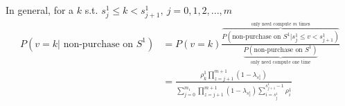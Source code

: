 In general, for a $k$ s.t. $s_{j}^1\leq k< s_{j+1}^1,\ j=0,1,2,...,m$
\begin{equation}
    \begin{aligned}
        P(v=k \vert\text{ non-purchase on }S^1)
        &=P(v=k)\frac{\overbrace{P(\text{non-purchase on }S^1\vert s_{j}^1\leq v< s_{j+1}^1)}^{\text{only need compute $m$ times}}}{\underbrace{P(\text{non-purchase on }S^1)}_{\text{only need compute one time}}}\\
        &=\frac{\rho_k^1\prod_{z=j+1}^{m+1}(1-\lambda_{s_{z}^1})}{\sum_{j=0}^{m_1} \prod_{z=j+1}^{m+1}(1-\lambda_{s_{z}^1})\sum_{i=s_j^1}^{s_{j+1}^1-1}\rho_i^1}\\
    \end{aligned}
    \nonumber
\end{equation}